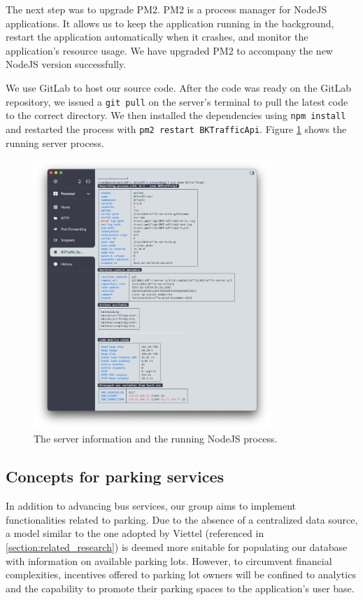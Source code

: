 The next step was to upgrade PM2. PM2 is a process manager for NodeJS applications. It allows us to keep the application running in the background, restart the application automatically when it crashes, and monitor the application's resource usage. We have upgraded PM2 to accompany the new NodeJS version successfully.

We use GitLab to host our source code. After the code was ready on the GitLab repository, we issued a \lstinline{git pull} on the server's terminal to pull the latest code to the correct directory. We then installed the dependencies using \lstinline{npm install} and restarted the process with \lstinline{pm2 restart BKTrafficApi}. Figure \ref{fig:pm2_show} shows the running server process.

\begin{figure}[H]
    \centering
    \includegraphics[width=0.8\textwidth]{assets/images/Implementation/pm2_show.png}
    \caption{The server information and the running NodeJS process.}
    \label{fig:pm2_show}
\end{figure}

\subsection{Concepts for parking services}

In addition to advancing bus services, our group aims to implement functionalities related to parking. Due to the absence of a centralized data source, a model similar to the one adopted by Viettel (referenced in \ref{section:related_research}) is deemed more suitable for populating our database with information on available parking lots. However, to circumvent financial complexities, incentives offered to parking lot owners will be confined to analytics and the capability to promote their parking spaces to the application's user base.

